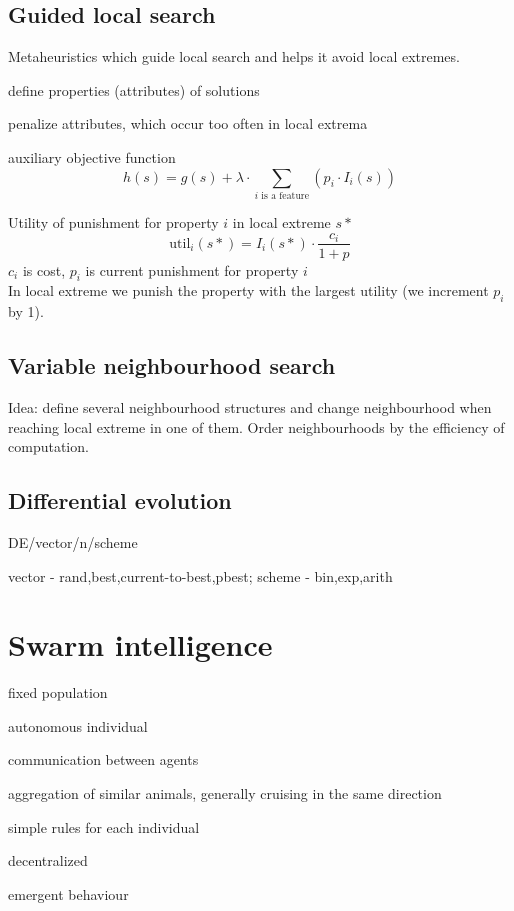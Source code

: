 \documentclass[a4paper]{article}
\begin{document}
\begin{multicols*}{2}
{\subsection{Guided local search}
Metaheuristics which guide local search and helps it avoid local extremes.
\begin{compactitem}
	\item define properties (attributes) of solutions
	\item penalize attributes, which occur too often in local extrema
	\item auxiliary objective function
	\[h(s) = g(s) + \lambda \cdot \sum_{i\text{ is a feature}}(p_i\cdot I_i(s))\]
\end{compactitem}
Utility of punishment for property $i$ in local extreme $s*$
\[
\text{util}_i(s*) = I_i(s*) \cdot \frac{c_i}{1+p}
\]
$c_i$ is cost, $p_i$ is current punishment for property $i$ \\
In local extreme we punish the property with the largest utility (we increment $p_i$ by 1).
\subsection{Variable neighbourhood search}
Idea: define several neighbourhood structures and change neighbourhood when reaching local extreme
in one of them. Order neighbourhoods by the efficiency of computation.

\subsection{Differential evolution}
DE/vector/n/scheme

vector - rand,best,current-to-best,pbest; scheme - bin,exp,arith

\section{Swarm intelligence}
\begin{compactitem}
	\item fixed population
	\item autonomous individual
	\item communication between agents
	\item aggregation of similar animals, generally cruising in the same direction
	\item simple rules for each individual
	\item decentralized
	\item emergent behaviour
\end{compactitem}
}
\end{multicols*}
\end{document}
